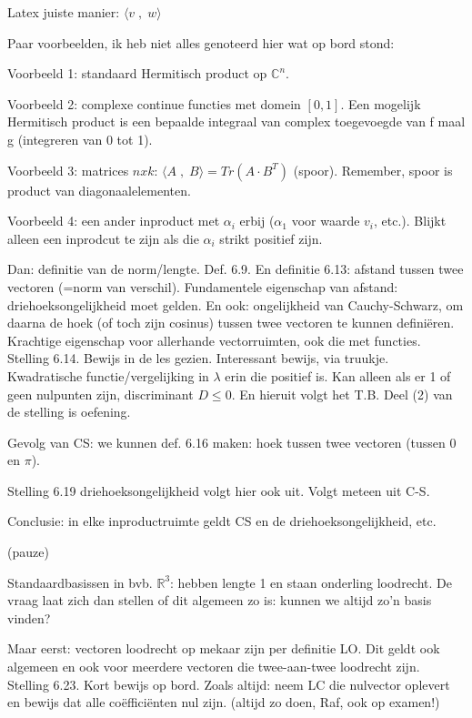 \documentclass{article}
\begin{document}
Latex juiste manier: $\langle v \; , \; w \rangle$

Paar voorbeelden, ik heb niet alles genoteerd hier wat op bord stond: 

Voorbeeld 1: standaard Hermitisch product op $\mathbb{C}^n$. 

Voorbeeld 2: complexe continue functies met domein $[0,1]$. Een mogelijk Hermitisch product is een bepaalde integraal van complex toegevoegde van f maal g (integreren van 0 tot 1). 

Voorbeeld 3: matrices $nxk$: $\langle A \; , \; B \rangle = Tr(A \cdot B^T) $ (spoor). Remember, spoor is product van diagonaalelementen. 

Voorbeeld 4: een ander inproduct met $\alpha_i$ erbij ($\alpha_1$ voor waarde $v_i$, etc.). Blijkt alleen een inprodcut te zijn als die $\alpha_i$ strikt positief zijn. 

Dan: definitie van de norm/lengte. Def. 6.9. En definitie 6.13: afstand tussen twee vectoren (=norm van verschil). 
Fundamentele eigenschap van afstand: driehoeksongelijkheid moet gelden. En ook: ongelijkheid van Cauchy-Schwarz, om daarna de hoek (of toch zijn cosinus) tussen twee vectoren te kunnen defini\"eren. Krachtige eigenschap voor allerhande vectorruimten, ook die met functies. Stelling 6.14. 
Bewijs in de les gezien. Interessant bewijs, via truukje. Kwadratische functie/vergelijking in $\lambda$ erin die positief is. Kan alleen als er 1 of geen nulpunten zijn, discriminant $D \leq 0$. En hieruit volgt het T.B. Deel (2) van de stelling is oefening. 

Gevolg van CS: we kunnen def. 6.16 maken: hoek tussen twee vectoren (tussen $0$ en $\pi$). 

Stelling 6.19 driehoeksongelijkheid volgt hier ook uit. Volgt meteen uit C-S. 

Conclusie: in elke inproductruimte geldt CS en de driehoeksongelijkheid, etc.  

(pauze) 

Standaardbasissen in bvb. $\mathbb{R}^3$: hebben lengte 1 en staan onderling loodrecht. De vraag laat zich dan stellen of dit algemeen zo is: kunnen we altijd zo'n basis vinden? 

Maar eerst: vectoren loodrecht op mekaar zijn per definitie LO. Dit geldt ook algemeen en ook voor meerdere vectoren die twee-aan-twee loodrecht zijn. Stelling 6.23. Kort bewijs op bord. Zoals altijd: neem LC die nulvector oplevert en bewijs dat alle co\"effici\"enten nul zijn. (altijd zo doen, Raf, ook op examen!) 
\end{document}
